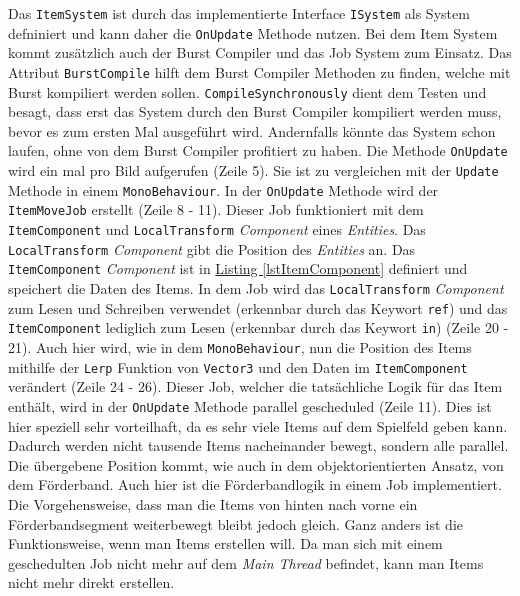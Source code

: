 Das \texttt{ItemSystem} ist durch das implementierte Interface \texttt{ISystem} als System defniniert und kann daher die \texttt{OnUpdate} Methode nutzen. Bei dem Item System kommt zusätzlich auch der Burst Compiler und das Job System zum Einsatz. Das Attribut \texttt{BurstCompile} hilft dem Burst Compiler Methoden zu finden, welche mit Burst kompiliert werden sollen. \texttt{CompileSynchronously} dient dem Testen und besagt, dass erst das System durch den Burst Compiler kompiliert werden muss, bevor es zum ersten Mal ausgeführt wird. Andernfalls könnte das System schon laufen, ohne von dem Burst Compiler profitiert zu haben. Die Methode \texttt{OnUpdate} wird ein mal pro Bild aufgerufen (Zeile 5). Sie ist zu vergleichen mit der \texttt{Update} Methode in einem \texttt{MonoBehaviour}. In der \texttt{OnUpdate} Methode wird der \texttt{ItemMoveJob} erstellt (Zeile 8 - 11). Dieser Job funktioniert mit dem \texttt{ItemComponent} und \texttt{LocalTransform} \textit{Component} eines \textit{Entities}. Das \texttt{LocalTransform} \textit{Component} gibt die Position des \textit{Entities} an. Das \texttt{ItemComponent} \textit{Component} ist in \hyperref[lstItemComponent]{Listing \ref{lstItemComponent}} definiert und speichert die Daten des Items. In dem Job wird das \texttt{LocalTransform} \textit{Component} zum Lesen und Schreiben verwendet (erkennbar durch das Keywort \texttt{ref}) und das \texttt{ItemComponent} lediglich zum Lesen (erkennbar durch das Keywort \texttt{in}) (Zeile 20 - 21). Auch hier wird, wie in dem \texttt{MonoBehaviour}, nun die Position des Items mithilfe der \texttt{Lerp} Funktion von \texttt{Vector3} und den Daten im \texttt{ItemComponent} verändert (Zeile 24 - 26). Dieser Job, welcher die tatsächliche Logik für das Item enthält, wird in der \texttt{OnUpdate} Methode parallel gescheduled (Zeile 11). Dies ist hier speziell sehr vorteilhaft, da es sehr viele Items auf dem Spielfeld geben kann. Dadurch werden nicht tausende Items nacheinander bewegt, sondern alle parallel.\\
Die übergebene Position kommt, wie auch in dem objektorientierten Ansatz, von dem Förderband. Auch hier ist die Förderbandlogik in einem Job implementiert. Die Vorgehensweise, dass man die Items von hinten nach vorne ein Förderbandsegment weiterbewegt bleibt jedoch gleich. Ganz anders ist die Funktionsweise, wenn man Items erstellen will. Da man sich mit einem geschedulten Job nicht mehr auf dem \textit{Main Thread} befindet, kann man Items nicht mehr direkt erstellen.
